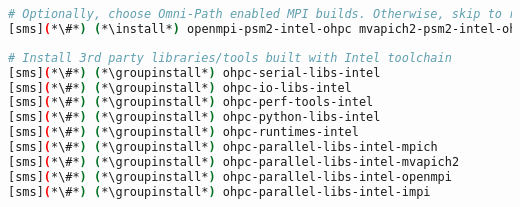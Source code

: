 \begin{lstlisting}[language=bash,keywords={},upquote=true,keepspaces]
# Optionally, choose Omni-Path enabled MPI builds. Otherwise, skip to retain default MPI stacks
[sms](*\#*) (*\install*) openmpi-psm2-intel-ohpc mvapich2-psm2-intel-ohpc
\end{lstlisting}

\begin{lstlisting}[language=bash,keywords={},upquote=true,keepspaces]
# Install 3rd party libraries/tools built with Intel toolchain
[sms](*\#*) (*\groupinstall*) ohpc-serial-libs-intel
[sms](*\#*) (*\groupinstall*) ohpc-io-libs-intel
[sms](*\#*) (*\groupinstall*) ohpc-perf-tools-intel
[sms](*\#*) (*\groupinstall*) ohpc-python-libs-intel
[sms](*\#*) (*\groupinstall*) ohpc-runtimes-intel
[sms](*\#*) (*\groupinstall*) ohpc-parallel-libs-intel-mpich
[sms](*\#*) (*\groupinstall*) ohpc-parallel-libs-intel-mvapich2
[sms](*\#*) (*\groupinstall*) ohpc-parallel-libs-intel-openmpi
[sms](*\#*) (*\groupinstall*) ohpc-parallel-libs-intel-impi
\end{lstlisting}

